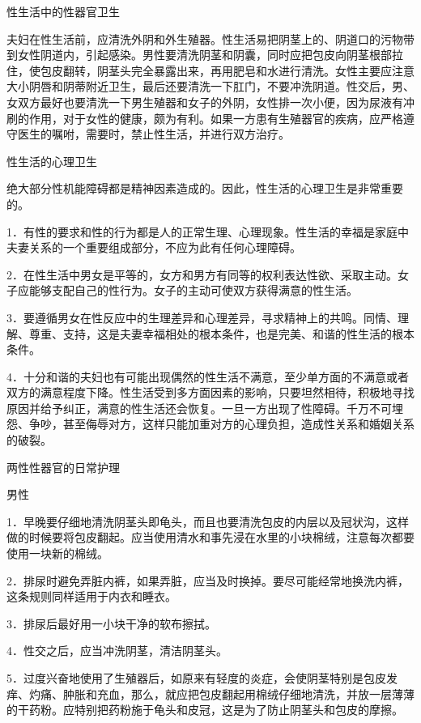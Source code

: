 \documentclass[12pt,UTF8]{ctexbook}
\begin{document}
性生活中的性器官卫生


夫妇在性生活前，应清洗外阴和外生殖器。性生活易把阴茎上的、阴道口的污物带到女性阴道内，引起感染。男性要清洗阴茎和阴囊，同时应把包皮向阴茎根部拉住，使包皮翻转，阴茎头完全暴露出来，再用肥皂和水进行清洗。女性主要应注意大小阴唇和阴蒂附近卫生，最后还要清洗一下肛门，不要冲洗阴道。性交后，男、女双方最好也要清洗一下男生殖器和女子的外阴，女性排一次小便，因为尿液有冲刷的作用，对于女性的健康，颇为有利。如果一方患有生殖器官的疾病，应严格遵守医生的嘱咐，需要时，禁止性生活，并进行双方治疗。





性生活的心理卫生


绝大部分性机能障碍都是精神因素造成的。因此，性生活的心理卫生是非常重要的。

1．有性的要求和性的行为都是人的正常生理、心理现象。性生活的幸福是家庭中夫妻关系的一个重要组成部分，不应为此有任何心理障碍。

2．在性生活中男女是平等的，女方和男方有同等的权利表达性欲、采取主动。女子应能够支配自己的性行为。女子的主动可使双方获得满意的性生活。

3．要遵循男女在性反应中的生理差异和心理差异，寻求精神上的共鸣。同情、理解、尊重、支持，这是夫妻幸福相处的根本条件，也是完美、和谐的性生活的根本条件。

4．十分和谐的夫妇也有可能出现偶然的性生活不满意，至少单方面的不满意或者双方的满意程度下降。性生活受到多方面因素的影响，只要坦然相待，积极地寻找原因并给予纠正，满意的性生活还会恢复。一旦一方出现了性障碍。千万不可埋怨、争吵，甚至侮辱对方，这样只能加重对方的心理负担，造成性关系和婚姻关系的破裂。





两性性器官的日常护理


男性

1．早晚要仔细地清洗阴茎头即龟头，而且也要清洗包皮的内层以及冠状沟，这样做的时候要将包皮翻起。应当使用清水和事先浸在水里的小块棉绒，注意每次都要使用一块新的棉绒。

2．排尿时避免弄脏内裤，如果弄脏，应当及时换掉。要尽可能经常地换洗内裤，这条规则同样适用于内衣和睡衣。

3．排尿后最好用一小块干净的软布擦拭。

4．性交之后，应当冲洗阴茎，清洁阴茎头。

5．过度兴奋地使用了生殖器后，如原来有轻度的炎症，会使阴茎特别是包皮发痒、灼痛、肿胀和充血，那么，就应把包皮翻起用棉绒仔细地清洗，并放一层薄薄的干药粉。应特别把药粉施于龟头和皮冠，这是为了防止阴茎头和包皮的摩擦。
\end{document}
